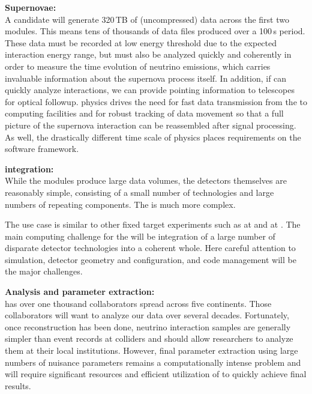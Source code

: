 \documentclass[../main-v1.tex]{subfiles}
\begin{document}
\begin{description}
\item{\bf Supernovae:\\}A %
 candidate will generate 320\,TB of (uncompressed) data across the first two modules. This means tens of thousands of data files produced over a 100\,s period. These data must be recorded at low energy threshold due to the expected interaction energy range, but must also be analyzed quickly and coherently in order to measure the time evolution of neutrino emissions, which carries invaluable information about the supernova process itself. In addition, if  can quickly analyze  interactions, we can provide pointing information to telescopes for optical followup.  %
 physics drives the need for fast data transmission from the  to computing facilities and for robust tracking of data movement so that a full picture of the supernova interaction can be reassembled after signal processing.
As well, the drastically different time scale of  physics places requirements on the software framework. %

\item{\bf {} integration: \\}
While the  %
modules produce large data volumes, the detectors themselves are reasonably simple, consisting of a small number of technologies and large numbers of repeating components.  The  is much more complex. 

The  use case is similar to other fixed target experiments such as  at  and  at .  The main computing challenge for the  will be integration of a large number of disparate detector technologies into a coherent whole. Here careful attention to simulation, detector geometry and configuration, and code management will be the major challenges. 

\item{\bf Analysis and parameter extraction:\\}
 has over one thousand collaborators spread across five continents. Those collaborators will want to analyze our data over several decades. Fortunately, once reconstruction has been done, neutrino interaction samples are generally simpler than event records at colliders and should %
allow researchers to analyze them at their local institutions. However, final parameter extraction  using large numbers of nuisance parameters remains a computationally intense problem and will require significant resources
and efficient utilization of  to quickly achieve final results. 



\end{description}
\end{document}
